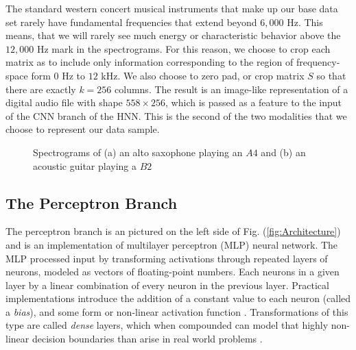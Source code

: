 \documentclass[conference,onecolumn,letterpaper]{IEEEtran}
\begin{document}
The standard western concert musical instruments that make up our base data set rarely have fundamental frequencies that extend beyond $6,000$ Hz. This means, that we will rarely see much energy or characteristic behavior above the $12,000$ Hz mark in the spectrograms. For this reason, we choose to crop each matrix as to include only information corresponding to the region of frequency-space form $0$ Hz to $12$ kHz. We also choose to zero pad, or crop matrix $S$ so that there are exactly $k = 256$ columns. The result is an image-like representation of a digital audio file with shape $558 \times 256$, which is passed as a feature to the input of the CNN branch of the HNN. This is the second of the two modalities that we choose to represent our data sample.

\begin{figure}[h]
    \centering
    \caption{Spectrograms of (a) an alto saxophone playing an $A4$ and (b) an acoustic guitar playing a $B2$}
    \label{fig:Example Spectrograms}
\end{figure}


\subsection{The Perceptron Branch}
\label{subsec:MLP}

The perceptron branch is an pictured on the left side of Fig. (\ref{fig:Architecture}) and is an implementation of multilayer perceptron (MLP) neural network. The MLP processed input by transforming activations through repeated layers of neurons, modeled as vectors of floating-point numbers. Each neurons in a given layer by a linear combination of every neuron in the previous layer. Practical implementations introduce the addition of a constant value to each neuron (called a \textit{bias}), and some form or non-linear activation function \cite{Geron,Goodfellow}. Transformations of this type are called \textit{dense} layers, which when compounded can model that highly non-linear decision boundaries than arise in real world problems \cite{James}.
\end{document}
